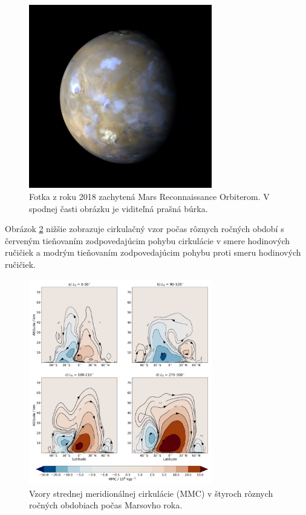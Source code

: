 \begin{figure}[!htbp]
  \centering
  \includegraphics[width=8cm]{img/dust_storm_MARS.jpg}
  \caption{Fotka z roku 2018 zachytená Mars Reconnaissance Orbiterom. V spodnej časti obrázku je viditeľná prašná búrka.}
  \label{duststorm}
\end{figure}

Obrázok \ref{circLS} nižšie zobrazuje cirkulačný vzor počas rôznych ročných období s červeným tieňovaním zodpovedajúcim pohybu cirkulácie v smere hodinových ručičiek a modrým tieňovaním zodpovedajúcim pohybu proti smeru hodinových ručičiek. 

\begin{figure}[!htbp]
  \centering
  \includegraphics[width=8cm]{img/MARS_circulation_openMars_LS.jpg}
  \caption{Vzory strednej meridionálnej cirkulácie (MMC) v štyroch rôznych ročných obdobiach počas Marsovho roka.}
  \label{circLS}
\end{figure}

